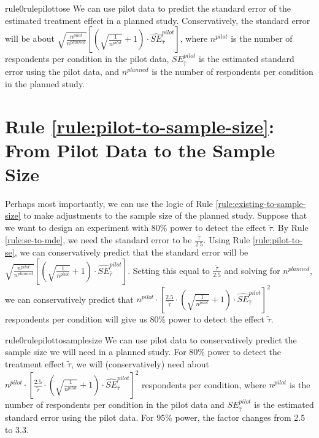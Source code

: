 \documentclass[12pt]{article}
\begin{document}
\begin{restatable}{rule0}{rulepilottose}
\label{rule:pilot-to-se}
We can use pilot data to predict the standard error of the estimated treatment effect in a planned study. Conservatively, the standard error will be about $\sqrt{\frac{n^{pilot}}{n^{planned}}}\left\lbrack \left( \sqrt{\frac{1}{n^{pilot}}} + 1 \right) \cdot {\widehat{SE}}_{\widehat{\tau}}^{pilot} \right\rbrack$, where $n^{pilot}$ is the number of respondents per condition in the pilot data, $SE_{\widehat{\tau}}^{pilot}$ is the estimated standard error using the pilot data, and $n^{planned}$ is the number of respondents per condition in the planned study. 
\end{restatable}

\section*{Rule \ref{rule:pilot-to-sample-size}: From Pilot Data to the Sample Size}

Perhaps most importantly, we can use the logic of Rule \ref{rule:existing-to-sample-size} to make adjustments to the sample size of the planned study. 
Suppose that we want to design an experiment with 80\% power to detect the effect $\widetilde{\tau}$. 
By Rule \ref{rule:se-to-mde}, we need the standard error to be $\frac{\widetilde{\tau}}{2.5}$. 
Using Rule \ref{rule:pilot-to-se}, we can conservatively predict that the standard error will be $\sqrt{\frac{n^{pilot}}{n^{planned}}}\left\lbrack \left( \sqrt{\frac{1}{n^{pilot}}} + 1 \right) \cdot {\widehat{SE}}_{\widehat{\tau}}^{pilot} \right\rbrack$.
Setting this equal to $\frac{\widetilde{\tau}}{2.5}$ and solving for $n^{planned}$, we can conservatively predict that $n^{pilot} \cdot \left\lbrack \frac{2.5}{\widetilde{\tau}} \cdot \left( \sqrt{\frac{1}{n^{pilot}}} + 1 \right) \cdot {\widehat{SE}}_{\widehat{\tau}}^{pilot} \right\rbrack^{2}$ respondents per condition will give us 80\% power to detect the effect $\widetilde{\tau}$.

\begin{restatable}{rule0}{rulepilottosamplesize}
\label{rule:pilot-to-sample-size}
We can use pilot data to conservatively predict the sample size we will need in a planned study. 
For 80\% power to detect the treatment effect $\widetilde{\tau}$, we will (conservatively) need about $n^{pilot} \cdot \left\lbrack \frac{2.5}{\widetilde{\tau}} \cdot \left( \sqrt{\frac{1}{n^{pilot}}} + 1 \right) \cdot {\widehat{SE}}_{\widehat{\tau}}^{pilot} \right\rbrack^{2}$ respondents per condition, where $n^{pilot}$ is the number of respondents per condition in the pilot data and $SE_{\widehat{\tau}}^{pilot}$ is the estimated standard error using the pilot data.
For 95\% power, the factor changes from 2.5 to 3.3.
\end{restatable}
\end{document}
